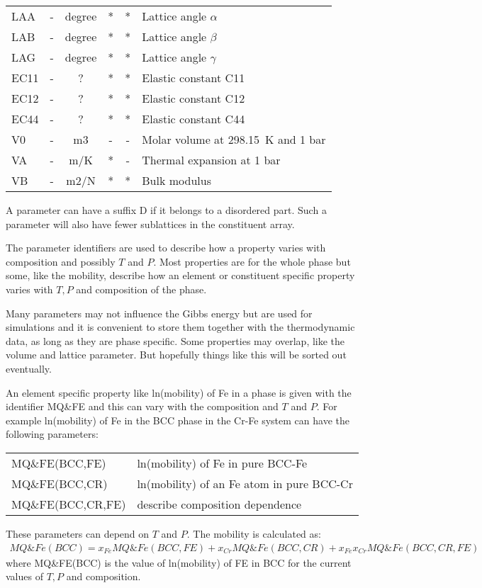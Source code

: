 \documentclass[12pt]{article}
\begin{document}
\begin{tabular}{lccccl}
LAA   & - &degree& * & * & Lattice angle $\alpha$\\
LAB   & - &degree& * & * & Lattice angle $\beta$\\
LAG   & - &degree& * & * & Lattice angle $\gamma$\\
EC11  & - & ? &* & * & Elastic constant C11\\
EC12  & - & ? &* & * & Elastic constant C12\\
EC44  & - & ? &* & * & Elastic constant C44\\
V0    & - & m3 &- & - & Molar volume at 298.15~K and 1 bar\\
VA    & - & m/K & * & - & Thermal expansion at 1 bar\\
VB    & - & m2/N & * & * &Bulk modulus\\\hline
\end{tabular}

\bigskip

A parameter can have a suffix D if it belongs to a disordered part.
Such a parameter will also have fewer sublattices in the constituent
array.

The parameter identifiers are used to describe how a property varies
with composition and possibly $T$ and $P$.  Most properties are for
the whole phase but some, like the mobility, describe how an element
or constituent specific property varies with $T, P$ and composition of
the phase.

Many parameters may not influence the Gibbs energy but are used for
simulations and it is convenient to store them together with the
thermodynamic data, as long as they are phase specific.  Some
properties may overlap, like the volume and lattice parameter.  But
hopefully things like this will be sorted out eventually.

An element specific property like ln(mobility) of Fe in a phase is
given with the identifier MQ\&FE and this can vary with the
composition and $T$ and $P$.  For example ln(mobility) of Fe in the
BCC phase in the Cr-Fe system can have the following parameters:

\begin{tabular}{ll}
MQ\&FE(BCC,FE) & ln(mobility) of Fe in pure BCC-Fe\\
MQ\&FE(BCC,CR) & ln(mobility) of an Fe atom in pure BCC-Cr\\
MQ\&FE(BCC,CR,FE) & describe composition dependence\\
\end{tabular}

These parameters can depend on $T$ and $P$.  The mobility is
calculated as:
{\small
\begin{eqnarray}
MQ\&Fe(BCC) = x_{Fe}MQ\&Fe(BCC,FE)+x_{Cr}MQ\&Fe(BCC,CR)+x_{Fe}x_{Cr}MQ\&Fe(BCC,CR,FE)
\end{eqnarray}}
where MQ\&FE(BCC) is the value of ln(mobility) of FE in BCC for the
current values of $T, P$ and composition.
\end{document}
